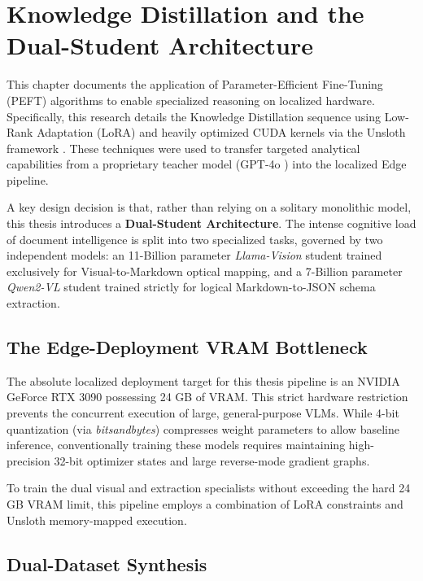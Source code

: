 \chapter{Knowledge Distillation and the Dual-Student Architecture}
\label{ch:distillation}

This chapter documents the application of Parameter-Efficient Fine-Tuning (PEFT) \citep{peft_houlsby} algorithms to enable specialized reasoning on localized hardware. Specifically, this research details the Knowledge Distillation \citep{knowledge_distill} sequence using Low-Rank Adaptation (LoRA) \citep{lora} and heavily optimized CUDA kernels via the Unsloth framework \citep{unsloth}. These techniques were used to transfer targeted analytical capabilities from a proprietary teacher model (GPT-4o \citep{gpt4v}) into the localized Edge pipeline.

A key design decision is that, rather than relying on a solitary monolithic model, this thesis introduces a \textbf{Dual-Student Architecture}. The intense cognitive load of document intelligence is split into two specialized tasks, governed by two independent models: an 11-Billion parameter \textit{Llama-Vision} student trained exclusively for Visual-to-Markdown optical mapping, and a 7-Billion parameter \textit{Qwen2-VL} student trained strictly for logical Markdown-to-JSON schema extraction.

\section{The Edge-Deployment VRAM Bottleneck}
\label{sec:vram_limits}

The absolute localized deployment target for this thesis pipeline is an NVIDIA GeForce RTX 3090 possessing 24 GB of VRAM. This strict hardware restriction prevents the concurrent execution of large, general-purpose VLMs. While 4-bit quantization (via \textit{bitsandbytes}) compresses weight parameters to allow baseline inference, conventionally training these models requires maintaining high-precision 32-bit optimizer states and large reverse-mode gradient graphs.

To train the dual visual and extraction specialists without exceeding the hard 24 GB VRAM limit, this pipeline employs a combination of LoRA constraints and Unsloth memory-mapped execution.

\section{Dual-Dataset Synthesis}
\label{sec:dataset_synthesis}

